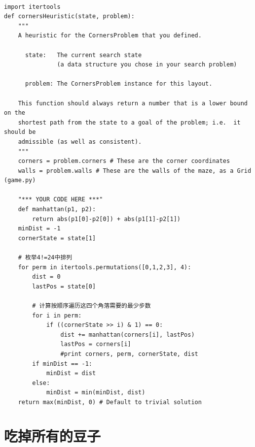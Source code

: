 \documentclass[forprint]{WHUBachelor}
\begin{document}
\begin{verbatim}

import itertools
def cornersHeuristic(state, problem):
    """
    A heuristic for the CornersProblem that you defined.

      state:   The current search state
               (a data structure you chose in your search problem)

      problem: The CornersProblem instance for this layout.

    This function should always return a number that is a lower bound on the
    shortest path from the state to a goal of the problem; i.e.  it should be
    admissible (as well as consistent).
    """
    corners = problem.corners # These are the corner coordinates
    walls = problem.walls # These are the walls of the maze, as a Grid (game.py)

    "*** YOUR CODE HERE ***"
    def manhattan(p1, p2):
        return abs(p1[0]-p2[0]) + abs(p1[1]-p2[1])
    minDist = -1
    cornerState = state[1]

    # 枚举4!=24中排列
    for perm in itertools.permutations([0,1,2,3], 4):
        dist = 0
        lastPos = state[0]

        # 计算按顺序遍历这四个角落需要的最少步数
        for i in perm:
            if ((cornerState >> i) & 1) == 0:
                dist += manhattan(corners[i], lastPos)
                lastPos = corners[i]
                #print corners, perm, cornerState, dist
        if minDist == -1:
            minDist = dist
        else:
            minDist = min(minDist, dist)
    return max(minDist, 0) # Default to trivial solution

\end{verbatim}

\section{吃掉所有的豆子}
\end{document}
